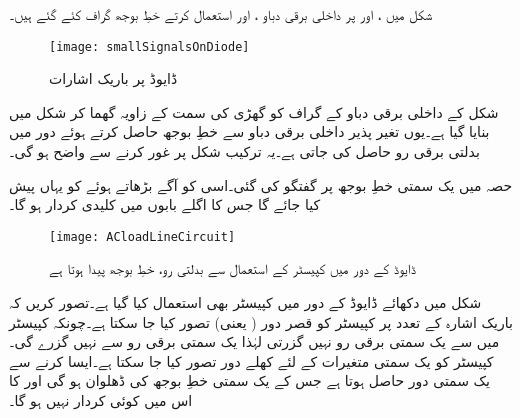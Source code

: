شکل   میں ،    اور    پر داخلی برقی دباو ،  اور  استعمال کرتے خطِ بوجھ گراف کئے گئے ہیں۔
\begin{figure}
\centering
\texttt{[image: smallSignalsOnDiode]}
\caption{ ڈایوڈ پر باریک اشارات}
\label{شکل_ڈایوڈ_پر_باریک_اشارات}
\end{figure}

شکل  کے داخلی برقی دباو کے گراف کو گھڑی کی سمت    کے زاویہ گھما کر شکل   میں بنایا گیا ہے۔یوں تغیر پذیر داخلی برقی دباو سے خطِ بوجھ حاصل کرتے ہوئے دور میں بدلتی برقی رو حاصل کی جاتی ہے۔یہ  ترکیب شکل پر غور کرنے سے واضح ہو گی۔


حصہ   میں یک سمتی خطِ بوجھ پر گفتگو کی گئی۔اسی کو آگے بڑھاتے ہوئے   کو یہاں پیش کیا جائے گا جس کا اگلے بابوں میں کلیدی کردار ہو گا۔
\begin{figure}
\centering
\texttt{[image: ACloadLineCircuit]}
\caption{ڈایوڈ کے دور میں کپیسٹر کے استعمال سے بدلتی رو، خطِ بوجھ پیدا ہوتا ہے}
\label{شکل_ڈایوڈ_بدلتے_بار_کا_دور}
\end{figure}
شکل   میں دکھائے ڈایوڈ کے دور میں کپیسٹر بھی استعمال کیا گیا ہے۔تصور کریں کہ باریک اشارہ  کے تعدد پر کپیسٹر کو قصر دور ( یعنی) تصور کیا جا سکتا ہے۔چونکہ کپیسٹر میں سے یک سمتی برقی رو نہیں گزرتی لہٰذا یک سمتی برقی رو   سے نہیں گزرے گی۔کپیسٹر کو یک سمتی متغیرات کے لئے کھلے دور تصور کیا جا سکتا ہے۔ایسا کرنے سے یک سمتی دور حاصل ہوتا ہے جس کے  یک سمتی خطِ بوجھ کی ڈھلوان  ہو گی اور   کا اس میں کوئی کردار نہیں ہو گا۔

